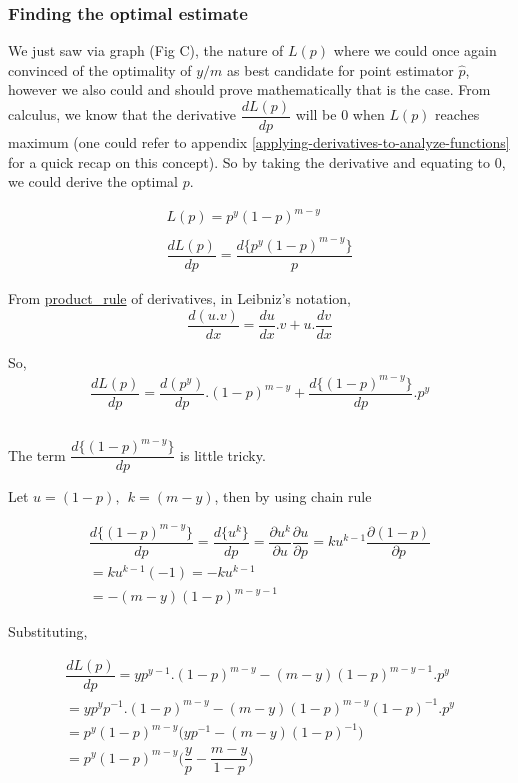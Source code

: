 \documentclass[float=false,crop=false]{standalone}
\begin{document}
    \subsubsection{Finding the optimal
estimate}\label{finding-the-optimal-estimate}

We just saw via graph (Fig C), the nature of \(L(p)\) where we could
once again convinced of the optimality of \(y/m\) as best candidate for
point estimator \(\hat{p}\), however we also could and should prove
mathematically that is the case. From calculus, we know that the
derivative \(\dfrac{dL(p)}{dp}\) will be 0 when \(L(p)\) reaches
maximum (one could refer to appendix \ref{applying-derivatives-to-analyze-functions} for a quick recap on this concept). So by taking the derivative and equating to 0, we could derive
the optimal \(p\).

\[
\begin{aligned}
L(p) = p^{y}(1 - p)^{m - y} \\ \\
\dfrac{dL(p)}{dp} = \dfrac{d\{ p^{y}(1 - p)^{m - y} \}}{p}
\end{aligned}
\]

From \href{https://en.wikipedia.org/wiki/Product_rule}{product\_rule} of
derivatives, in Leibniz's notation, \[
\dfrac{d(u.v)}{dx} = \dfrac{du}{dx}.v + u.\dfrac{dv}{dx}
\]

    So,\\
\[
\begin{aligned}
\dfrac{dL(p)}{dp} = \dfrac{d{(p^y)}}{dp}.(1-p)^{m-y} + \dfrac{d\{(1-p)^{m-y}\}}{dp}.p^y \\ \\ 
\end{aligned}
\]

The term \(\dfrac{d\{(1-p)^{m-y}\}}{dp}\) is little tricky.

Let \(u = (1-p),\ \  k = (m-y)\), then by using chain rule

\[
\begin{aligned}
\dfrac{d\{(1-p)^{m-y}\}}{dp} = \dfrac{d\{u^k\}}{dp} = \dfrac{\partial u^k}{\partial u}\dfrac{\partial u}{\partial p} = ku^{k-1}\dfrac{\partial (1-p)}{\partial p} \\
= ku^{k-1}(-1) = -ku^{k-1} \\
= -(m-y)(1-p)^{m-y-1}
\end{aligned}
\]

    Substituting,

\[
\begin{aligned}
\dfrac{dL(p)}{dp} = yp^{y-1}.(1-p)^{m-y} - (m-y)(1-p)^{m-y-1}.p^y \\
= yp^yp^{-1}.(1-p)^{m-y} - (m-y)(1-p)^{m-y}(1-p)^{-1}.p^y \\
= p^y(1-p)^{m-y}\Big(yp^{-1} - (m-y)(1-p)^{-1}\Big) \\
= p^y(1-p)^{m-y}\Big(\dfrac{y}{p} - \dfrac{m-y}{1-p}\Big)
\end{aligned}
\]
\end{document}
